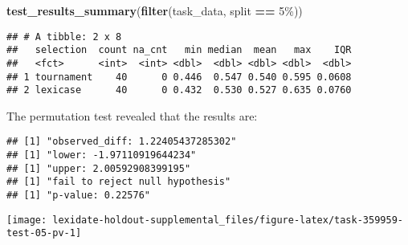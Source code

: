\documentclass[
]{book}
\newenvironment{Shaded}{\begin{snugshade}}{\end{snugshade}}
\newcommand{\AttributeTok}[1]{\textcolor[rgb]{0.13,0.29,0.53}{#1}}
\newcommand{\DecValTok}[1]{\textcolor[rgb]{0.00,0.00,0.81}{#1}}
\newcommand{\FunctionTok}[1]{\textcolor[rgb]{0.13,0.29,0.53}{\textbf{#1}}}
\newcommand{\NormalTok}[1]{#1}
\newcommand{\OtherTok}[1]{\textcolor[rgb]{0.56,0.35,0.01}{#1}}
\newcommand{\SpecialCharTok}[1]{\textcolor[rgb]{0.81,0.36,0.00}{\textbf{#1}}}
\newcommand{\StringTok}[1]{\textcolor[rgb]{0.31,0.60,0.02}{#1}}
\begin{document}
\begin{Shaded}
\begin{Highlighting}[]
\FunctionTok{test\_results\_summary}\NormalTok{(}\FunctionTok{filter}\NormalTok{(task\_data, split }\SpecialCharTok{==} \StringTok{\textquotesingle{}5\%\textquotesingle{}}\NormalTok{))}
\end{Highlighting}
\end{Shaded}

\begin{verbatim}
## # A tibble: 2 x 8
##   selection  count na_cnt   min median  mean   max    IQR
##   <fct>      <int>  <int> <dbl>  <dbl> <dbl> <dbl>  <dbl>
## 1 tournament    40      0 0.446  0.547 0.540 0.595 0.0608
## 2 lexicase      40      0 0.432  0.530 0.527 0.635 0.0760
\end{verbatim}

The permutation test revealed that the results are:

\begin{Shaded}
\end{Shaded}

\begin{verbatim}
## [1] "observed_diff: 1.22405437285302"
## [1] "lower: -1.97110919644234"
## [1] "upper: 2.00592908399195"
## [1] "fail to reject null hypothesis"
## [1] "p-value: 0.22576"
\end{verbatim}

\texttt{[image: lexidate-holdout-supplemental\_files/figure-latex/task-359959-test-05-pv-1]}
\end{document}

